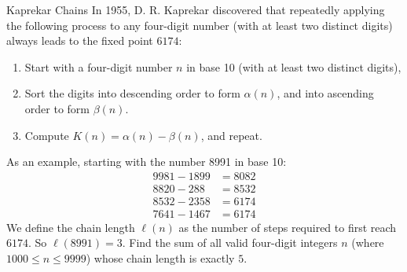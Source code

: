\begin{problem}{Kaprekar Chains}
    In 1955, D. R. Kaprekar discovered that repeatedly applying the following process to any four-digit number (with at least two distinct digits) always leads to the fixed point \(6174\):
    \begin{enumerate}
        \item Start with a four-digit number \(n\) in base 10 (with at least two distinct digits),
        \item Sort the digits into descending order to form \(\alpha(n)\), and into ascending order to form \(\beta(n)\).
        \item Compute \(K(n) = \alpha(n) - \beta(n)\), and repeat.
    \end{enumerate}
    As an example, starting with the number 8991 in base 10:
    \begin{align*}
        9981 - 1899 &= 8082 \\
        8820 - 288  &= 8532 \\
        8532 - 2358 &= 6174 \\
        7641 - 1467 &= 6174
    \end{align*}
    We define the chain length \(\ell(n)\) as the number of steps required to first reach \(6174\). So \(\ell(8991) = 3\). Find the sum of all valid four-digit integers \(n\) (where \(1000 \le n \le 9999\)) whose chain length is exactly \(5\).
\end{problem}
